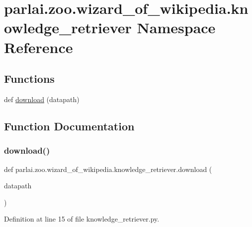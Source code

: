 \hypertarget{namespaceparlai_1_1zoo_1_1wizard__of__wikipedia_1_1knowledge__retriever}{}\section{parlai.\+zoo.\+wizard\+\_\+of\+\_\+wikipedia.\+knowledge\+\_\+retriever Namespace Reference}
\label{namespaceparlai_1_1zoo_1_1wizard__of__wikipedia_1_1knowledge__retriever}
\subsection*{Functions}
\begin{DoxyCompactItemize}
\item 
def \hyperlink{namespaceparlai_1_1zoo_1_1wizard__of__wikipedia_1_1knowledge__retriever_a106476a619c671f1333e4de41ee883b6}{download} (datapath)
\end{DoxyCompactItemize}


\subsection{Function Documentation}
\mbox{\label{namespaceparlai_1_1zoo_1_1wizard__of__wikipedia_1_1knowledge__retriever_a106476a619c671f1333e4de41ee883b6}} 
\subsubsection{\texorpdfstring{download()}{download()}}
{\footnotesize\ttfamily def parlai.\+zoo.\+wizard\+\_\+of\+\_\+wikipedia.\+knowledge\+\_\+retriever.\+download (\begin{DoxyParamCaption}\item[{}]{datapath }\end{DoxyParamCaption})}



Definition at line 15 of file knowledge\+\_\+retriever.\+py.


